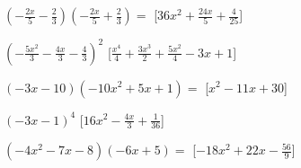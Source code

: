 \begin{esercizio}[\Ast]
\begin{enumeratea}
\item \(\left(- \frac{2 x}{5} - \frac{2}{3}\right)\left(- \frac{2 x}{5} + 
\frac{2}{3}\right)=\)
  \hfill [\(36 x^{2} + \frac{24 x}{5} + \frac{4}{25}\)]
\item \(\left(- \frac{5 x^{2}}{3} - \frac{4 x}{3} - \frac{4}{3}\right)^{2}\)
  \hfill [\(\frac{x^{4}}{4} + \frac{3 x^{3}}{2} + \frac{5 x^{2}}{4} - 3 x + 
1\)]
\item \(\left(- 3 x - 10\right)\left(- 10 x^{2} + 5 x + 1\right)=\)
  \hfill [\(x^{2} - 11 x + 30\)]
\item \(\left(- 3 x - 1\right)^{4}\)
  \hfill [\(16 x^{2} - \frac{4 x}{3} + \frac{1}{36}\)]
\item \(\left(- 4 x^{2} - 7 x - 8\right)\left(- 6 x + 5\right)=\)
  \hfill [\(- 18 x^{2} + 22 x - \frac{56}{9}\)]
 \end{enumeratea}
\end{esercizio}

